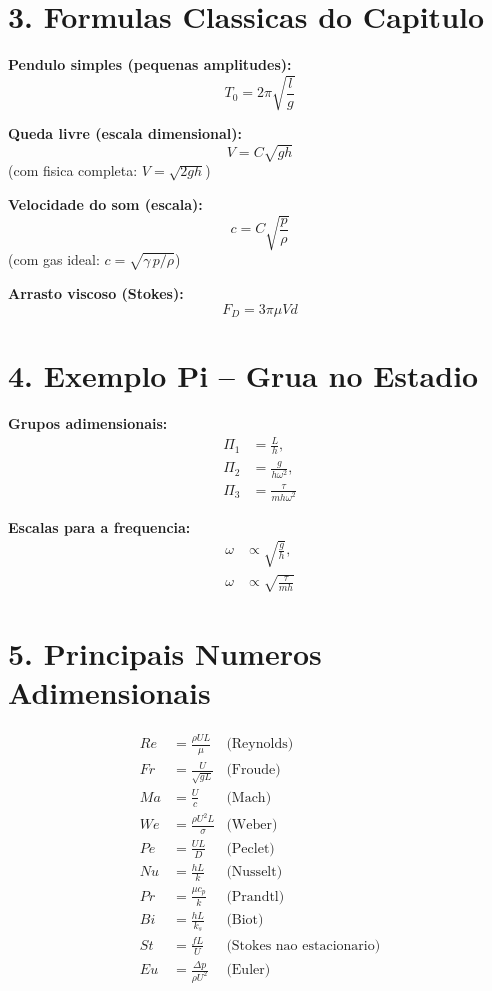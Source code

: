 \documentclass[12pt,a4paper]{article}
\begin{document}
\section*{3. Formulas Classicas do Capitulo}

\textbf{Pendulo simples (pequenas amplitudes):}
\begin{equation}
T_0 = 2\pi\sqrt{\frac{l}{g}}
\end{equation}

\textbf{Queda livre (escala dimensional):}
\begin{equation}
V = C\sqrt{gh}
\end{equation}
(com fisica completa: $V=\sqrt{2gh}$)

\textbf{Velocidade do som (escala):}
\begin{equation}
c = C\sqrt{\frac{p}{\rho}}
\end{equation}
(com gas ideal: $c=\sqrt{\gamma\,p/\rho}$)

\textbf{Arrasto viscoso (Stokes):}
\begin{equation}
F_D = 3\pi\mu V d
\end{equation}

\section*{4. Exemplo Pi -- Grua no Estadio}

\textbf{Grupos adimensionais:}
\begin{align}
\Pi_1 &= \frac{L}{h}, \\
\Pi_2 &= \frac{g}{h\omega^2}, \\
\Pi_3 &= \frac{\tau}{m h\omega^2}
\end{align}

\textbf{Escalas para a frequencia:}
\begin{align}
\omega &\propto \sqrt{\frac{g}{h}}, \\
\omega &\propto \sqrt{\frac{\tau}{m h}}
\end{align}

\section*{5. Principais Numeros Adimensionais}
\begin{align}
Re &= \frac{\rho U L}{\mu} & \text{(Reynolds)} \\
Fr &= \frac{U}{\sqrt{gL}} & \text{(Froude)} \\
Ma &= \frac{U}{c} & \text{(Mach)} \\
We &= \frac{\rho U^2 L}{\sigma} & \text{(Weber)} \\
Pe &= \frac{UL}{D} & \text{(Peclet)} \\
Nu &= \frac{hL}{k} & \text{(Nusselt)} \\
Pr &= \frac{\mu c_p}{k} & \text{(Prandtl)} \\
Bi &= \frac{hL}{k_s} & \text{(Biot)} \\
St &= \frac{fL}{U} & \text{(Stokes nao estacionario)} \\
Eu &= \frac{\Delta p}{\rho U^2} & \text{(Euler)}
\end{align}
\end{document}
